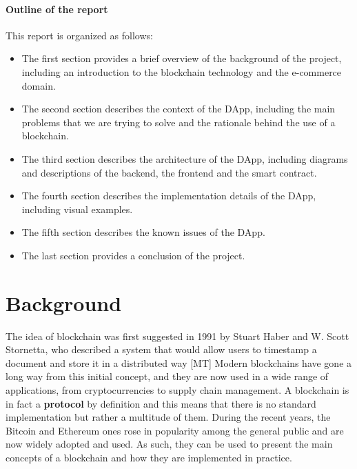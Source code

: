 \documentclass[12pt,a4paper,oneside]{article}
\theoremstyle{definition}
\begin{document}
\paragraph{Outline of the report} This report is organized as follows:
\begin{itemize}
	\item The first section provides a brief overview of the background of the project, including an introduction to the blockchain technology and the e-commerce domain.
	\item The second section describes the context of the DApp, including the main problems that we are trying to solve and the rationale behind the use of a blockchain.
	\item The third section describes the architecture of the DApp, including diagrams and descriptions of the backend, the frontend and the smart contract.
	\item The fourth section describes the implementation details of the DApp, including visual examples.
	\item The fifth section describes the known issues of the DApp.
	\item The last section provides a conclusion of the project.
\end{itemize}

\section{Background}

The idea of blockchain was first suggested in 1991 by Stuart Haber and W. Scott Stornetta, who described a system that would allow users to timestamp a document and store it in a distributed way [MT] Modern blockchains have gone a long way from this initial concept, and they are now used in a wide range of applications, from cryptocurrencies to supply chain management. A blockchain is in fact a \textbf{protocol} by definition and this means that there is no standard implementation but rather a multitude of them.
During the recent years, the Bitcoin and Ethereum ones rose in popularity among the general public and are now widely adopted and used. As such, they can be used to present the main concepts of a blockchain and how they are implemented in practice. \\
\end{document}
